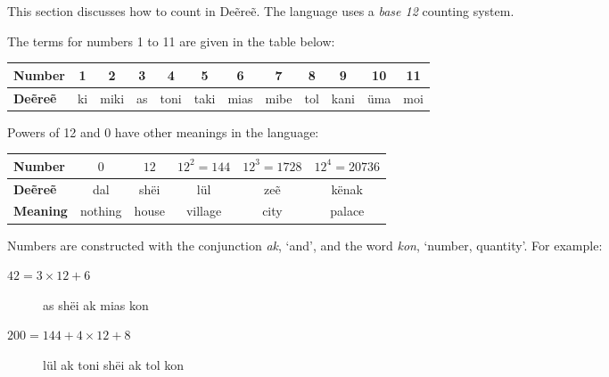This section discusses how to count in Deẽreẽ. The language uses a \emph{base 12} counting system.

The terms for numbers 1 to 11 are given in the table below:

\begin{center}\begin{tabular}{|l|c|c|c|c|c|c|c|c|c|c|c|}\hline

\textbf{Number} & 1 & 2 & 3 & 4 & 5 & 6 & 7 & 8 & 9 & 10 & 11 \\\hline
\textbf{Deẽreẽ} & ki & miki & as & toni & taki & mias & mibe & tol & kani & üma & moi\\\hline

\end{tabular}\end{center}

Powers of 12 and 0 have other meanings in the language:

\begin{center}\begin{tabular}{|l|c|c|c|c|c|}\hline

\textbf{Number} & $0$ & $12$ & $12^2 = 144$ & $12^3 = 1728$ & $12^4 = 20736$ \\\hline
\textbf{Deẽreẽ} & dal & shëi & lül & zeẽ & kënak \\\hline
\textbf{Meaning} & nothing & house & village & city & palace \\\hline

\end{tabular}\end{center}

Numbers are constructed with the conjunction \emph{ak}, ‘and’, and the word \emph{kon}, ‘number, quantity’. For example:

\begin{description}
\item[$42 = 3 \times 12 + 6$] as shëi ak mias kon
\item[$200 = 144 + 4 \times 12 + 8$] lül ak toni shëi ak tol kon
\end{description}


